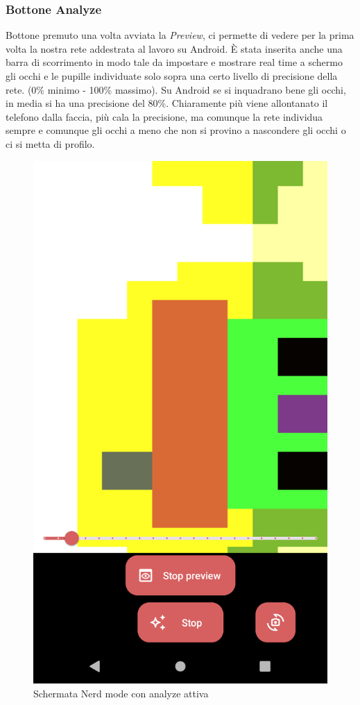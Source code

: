 \documentclass[11pt]{article}
\begin{document}
\newpage
\subsubsection{Bottone Analyze}
Bottone premuto una volta avviata la \textit{Preview}, ci permette di vedere per la prima volta la nostra rete addestrata al lavoro su Android.
È stata inserita anche una barra di scorrimento in modo tale da impostare e mostrare real time a schermo gli occhi e le pupille individuate solo sopra una certo livello di precisione della rete. (0\% minimo - 100\% massimo). Su Android se si inquadrano bene gli occhi, in media si ha una precisione del 80\%. 
\newline
Chiaramente più viene allontanato il telefono dalla faccia, più cala la precisione, ma comunque la rete individua sempre e comunque gli occhi a meno che non si provino a nascondere gli occhi o ci si metta di profilo.

\begin{figure}[h]
\caption{Schermata Nerd mode con analyze attiva }
\centering
\includegraphics[scale=0.17]{img/analyze.png}
\end{figure}
\end{document}
